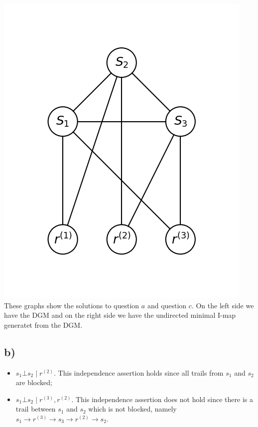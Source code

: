 \documentclass[11pt,a4paper]{article}
\begin{document}
\begin{multicols}{3}
\includegraphics[scale=0.6]{./images/q1c.png}
These graphs show the solutions to question $a$ and question $c$.
On the left side we have the DGM and on the right side we have the
undirected minimal I-map generatet from the DGM.
\end{multicols}


\subsection*{b)}
\begin{itemize}
\item $s_1 \bot s_2 \; | \; r^{(2)}$. This independence assertion holds since all trails from
$s_1$ and $s_2$ are blocked;
\item $s_1 \bot s_2 \; | \; r^{(3)}, r^{(2)}$. This independence assertion does not hold since
there is a trail between $s_1$ and $s_2$ which is not blocked, namely $s_1 \rightarrow r^{(3)} \rightarrow s_3
\rightarrow r^{(2)} \rightarrow s_2$.
\end{itemize}
\end{document}
